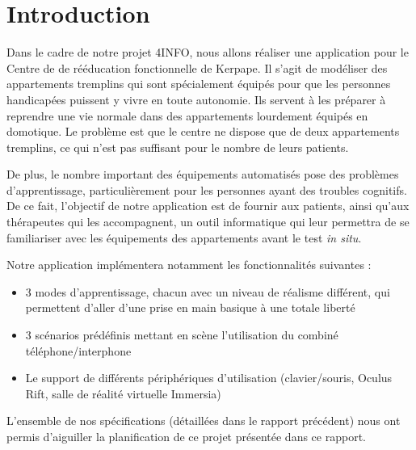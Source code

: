 \section{Introduction}
Dans le cadre de notre projet 4INFO, nous allons réaliser une application pour le Centre de de rééducation fonctionnelle de Kerpape. Il s'agit de modéliser des appartements tremplins qui sont spécialement équipés pour que les personnes handicapées puissent y vivre en toute autonomie. Ils servent à les préparer à reprendre une vie normale dans des appartements lourdement équipés en domotique. Le problème est que le centre ne dispose que de deux appartements tremplins, ce qui n'est pas suffisant pour le nombre de leurs patients.\newline

De plus, le nombre important des équipements automatisés pose des problèmes d'apprentissage, particulièrement pour les personnes ayant des troubles cognitifs. De ce fait, l'objectif de notre application est de fournir aux patients, ainsi qu'aux thérapeutes qui les accompagnent, un outil informatique qui leur permettra de se familiariser avec les équipements des appartements avant le test \textit{in situ}. \newline

Notre application implémentera notamment les fonctionnalités suivantes :
\begin{itemize}\renewcommand{\labelitemi}{$\bullet$}
	\item 3 modes d'apprentissage, chacun avec un niveau de réalisme différent, qui permettent d'aller d'une prise en main basique à une totale liberté
	\item 3 scénarios prédéfinis mettant en scène l'utilisation du combiné téléphone/interphone
	\item Le support de différents périphériques d'utilisation (clavier/souris, Oculus Rift, salle de réalité virtuelle Immersia)
\end{itemize}
\vspace{0.5cm}
\hspace{0.5cm}L'ensemble de nos spécifications (détaillées dans le rapport précédent) nous ont permis d'aiguiller la planification de ce projet présentée dans ce rapport.